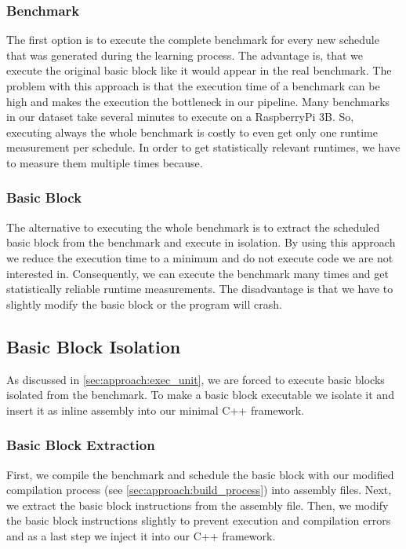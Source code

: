 \subsubsection{Benchmark}
The first option is to execute the complete benchmark for every new schedule that was generated during the learning process.
The advantage is, that we execute the original basic block like it would appear in the real benchmark.
The problem with this approach is that the execution time of a benchmark can be high and makes the execution the bottleneck in our pipeline.
Many benchmarks in our dataset take several minutes to execute on a RaspberryPi 3B.
So, executing always the whole benchmark is costly to even get only one runtime measurement per schedule.
In order to get statistically relevant runtimes, we have to measure them multiple times because.

\subsubsection{Basic Block}
The alternative to executing the whole benchmark is to extract the scheduled basic block from the benchmark and execute in isolation.
By using this approach we reduce the execution time to a minimum and do not execute code we are not interested in.
Consequently, we can execute the benchmark many times and get statistically reliable runtime measurements.
The disadvantage is that we have to slightly modify the basic block or the program will crash.

\subsection{Basic Block Isolation}
\label{sec:approach:bbisolation}
As discussed in \cref{sec:approach:exec_unit}, we are forced to execute basic blocks isolated from the benchmark.
To make a basic block executable we isolate it and insert it as inline assembly into our minimal C++ framework.

\subsubsection{Basic Block Extraction}
First, we compile the benchmark and schedule the basic block with our modified compilation process (see \cref{sec:approach:build_process}) into assembly files.
Next, we extract the basic block instructions from the assembly file.
Then, we modify the basic block instructions slightly to prevent execution and compilation errors and as a last step we inject it into our C++ framework.

